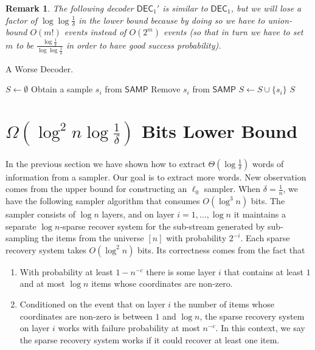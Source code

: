 \documentclass[10pt]{article}
\newtheorem{remark}{Remark}
\newcommand{\samp}{\textsf{SAMP}\xspace}
\newcommand{\dec}{\textsf{DEC}\xspace}
\begin{document}
\begin{remark}
  The following decoder $\dec_1'$ is similar to $\dec_1$, but we will lose a factor of $\log\log \frac{1}{\delta}$ in the lower bound because by doing so we have to union-bound $O(m!)$ events instead of $O(2^m)$ events (so that in turn we have to set $m$ to be $\frac{\log \frac{1}{\delta}}{\log\log\frac{1}{\delta}}$ in order to have good success probability). 
\end{remark}

\begin{algorithm}[H]
\caption{A Worse Decoder.}
\begin{algorithmic}[1]
\Procedure{$\dec_1'$}{\samp}
\State $S\leftarrow \emptyset$
\State Obtain a sample $s_i$ from $\samp$
\State Remove $s_i$ from $\samp$
\State $S \leftarrow S \cup \{s_i\}$
\EndFor
\State \Return $S$ 
\EndProcedure
\end{algorithmic}
\end{algorithm}


\section{$\Omega(\log^2 n \log \frac{1}{\delta})$ Bits Lower Bound} \label{sec:optimal-lb}

In the previous section we have shown how to extract $\Theta(\log \frac{1}{\delta})$ words of information from a sampler. 
Our goal is to extract more words. New observation comes from the upper bound for constructing an $\ell_0$ sampler. 
When $\delta=\frac{1}{n}$, we have the following sampler algorithm that consumes $O(\log^3 n)$ bits. 
The sampler consists of $\log n$ layers, and on layer $i=1,\ldots, \log n$ it maintains a separate $\log n$-sparse recover system for the sub-stream generated by sub-sampling the items from the universe $[n]$ with probability $2^{-i}$.
Each sparse recovery system takes $O(\log^2 n)$ bits. 
Its correctness comes from the fact that 
\begin{enumerate}
  \item With probability at least $1-n^{-c}$ there is some layer $i$ that contains at least $1$ and at most $\log n$ items whose coordinates are non-zero. 
  \item Conditioned on the event that on layer $i$ the number of items whose coordinates are non-zero is between $1$ and $\log n$, the sparse recovery system on layer $i$ works with failure probability at most $n^{-c}$. In this context, we say the sparse recovery system works if it could recover at least one item. 
\end{enumerate}
\end{document}
